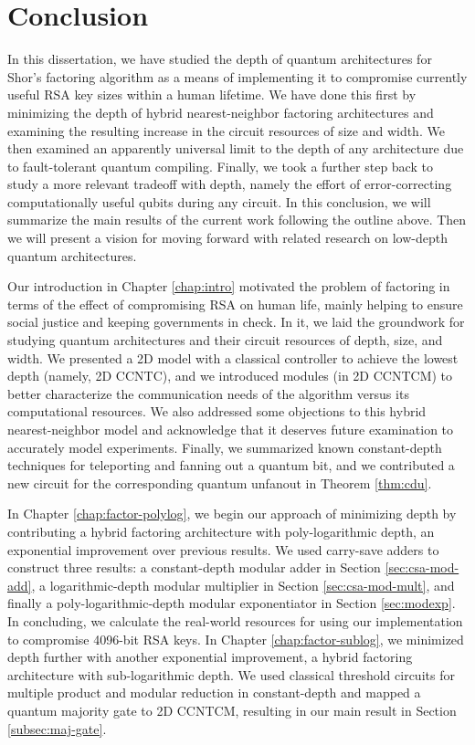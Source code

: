 \chapter{Conclusion}
\label{chap:conclude}

In this dissertation, we have studied the depth of quantum architectures
for Shor's factoring algorithm as a means of implementing it to
compromise currently useful RSA key sizes within a human lifetime.
We have done this first by minimizing the depth
of hybrid nearest-neighbor factoring architectures and examining the 
resulting increase in the circuit resources of size and width.
We then examined an apparently universal limit to the depth of any architecture due to fault-tolerant quantum compiling. Finally, we
took a further step back to study a more relevant tradeoff with
depth, namely the effort of error-correcting computationally useful
qubits during any circuit. In this conclusion, we will summarize the
main results of the current work following the outline above.
Then we will present a vision for moving forward
with related research on low-depth quantum architectures.

Our introduction in Chapter \ref{chap:intro} motivated the problem of
factoring in terms of the effect of compromising RSA on human life,
mainly helping to ensure social justice and keeping governments in check.
In it, we laid the groundwork for studying quantum architectures and
their circuit resources of depth, size, and width. We presented
a 2D model
with a classical controller to achieve
the lowest depth (namely, \textsf{2D CCNTC}), and we introduced modules
(in \textsf{2D CCNTCM}) to
better characterize the communication needs of the algorithm versus
its computational resources. We also addressed some objections to
this hybrid nearest-neighbor model
and acknowledge that it deserves future examination
to accurately model experiments. Finally, we summarized known constant-depth
techniques for teleporting and fanning out a quantum bit, and we
contributed a new circuit for the corresponding quantum unfanout in
Theorem \ref{thm:cdu}. 

In Chapter \ref{chap:factor-polylog}, we begin our approach of minimizing
depth by contributing a hybrid factoring architecture with poly-logarithmic
depth, an exponential improvement over previous results. We used
carry-save adders to construct three results:
a constant-depth modular adder in
Section \ref{sec:csa-mod-add}, a logarithmic-depth modular multiplier in
Section \ref{sec:csa-mod-mult}, and finally a poly-logarithmic-depth
modular exponentiator in Section \ref{sec:modexp}. In concluding, we
calculate the real-world resources for using our implementation to
compromise 4096-bit RSA keys. In Chapter \ref{chap:factor-sublog}, we minimized depth further with another exponential improvement,
a hybrid factoring architecture with sub-logarithmic depth. We used
classical threshold circuits for multiple product and modular reduction
in constant-depth and mapped a quantum majority gate to \textsf{2D CCNTCM},
resulting in our main result in Section \ref{subsec:maj-gate}.

